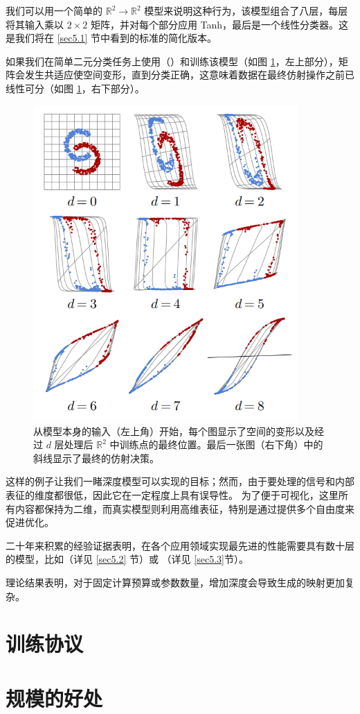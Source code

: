 我们可以用一个简单的 $\mathbb{R}^2 \to \mathbb{R}^2$ 模型来说明这种行为，该模型组合了八层，每层将其输入乘以 $2 \times 2$ 矩阵，并对每个部分应用 Tanh，最后是一个线性分类器。这是我们将在 \ref{sec5.1} 节中看到的标准的简化版本。

如果我们在简单二元分类任务上使用（）和训练该模型（如图 \ref{fig3.4}，左上部分），矩阵会发生共适应使空间变形，直到分类正确，这意味着数据在最终仿射操作之前已线性可分（如图 \ref{fig3.4}，右下部分）。

\begin{figure}
    \centering
    \includegraphics[width=0.9\textwidth]{fig/fig3.4.png}
    \caption[特征扭曲]{从模型本身的输入（左上角）开始，每个图显示了空间的变形以及经过 $d$ 层处理后 $\mathbb{R}^2$ 中训练点的最终位置。最后一张图（右下角）中的斜线显示了最终的仿射决策。}
    \label{fig3.4}
\end{figure}

这样的例子让我们一睹深度模型可以实现的目标；然而，由于要处理的信号和内部表征的维度都很低，因此它在一定程度上具有误导性。 为了便于可视化，这里所有内容都保持为二维，而真实模型则利用高维表征，特别是通过提供多个自由度来促进优化。

二十年来积累的经验证据表明，在各个应用领域实现最先进的性能需要具有数十层的模型，比如（详见 \ref{sec5.2} 节）或 （详见 \ref{sec5.3}节）。

理论结果表明，对于固定计算预算或参数数量，增加深度会导致生成的映射更加复杂\citep{1602.04485}。

\section{训练协议}\label{sec3.7}

\section{规模的好处}